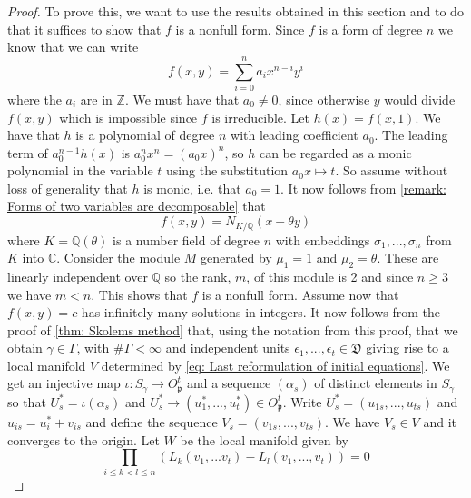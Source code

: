 \documentclass{article}
\newcommand{\mfrak}[1]{\mathfrak{#1}}
\newcommand{\mbb}[1]{\mathbb{#1}}
\numberwithin{equation}{section}
\begin{document}
\begin{proof}
	To prove this, we want to use the results obtained in this section and to do that it suffices to show that $f$ is a  nonfull form. Since $f$ is a form of degree $n$ we know that we can write
	$$f(x,y) = \sum_{i = 0}^n a_i x^{n-i} y^{i}$$
	where the $a_i$ are in $\mbb Z$. We must have that $a_0 \neq 0$, since otherwise $y$ would divide $f(x,y)$ which is impossible since $f$ is irreducible. Let $h(x) = f(x,1)$. We have that $h$ is a polynomial of degree $n$ with leading coefficient $a_0$. The leading term of $a_0^{n-1} h(x)$ is $a_0^nx^n = (a_0 x)^n$, so $h$ can be regarded as a monic polynomial in the variable $t$ using the substitution $a_0 x \mapsto t$. So assume without loss of generality that $h$ is monic, i.e. that $a_0 = 1$. It now follows from \cref{remark: Forms of two variables are decomposable} that
	\begin{equation}\label{eq: f(x,y) is a norm form}
    	f(x, y) = N_{K / \mbb Q}(x + \theta y)
	\end{equation}
	where $K = \mbb Q(\theta)$ is a number field of degree $n$ with embeddings $\sigma_1, ..., \sigma_n$ from $K$ into $\mbb C$. Consider the module $M$ generated by $\mu_1 = 1$ and $\mu_2 = \theta$. These are linearly independent over $\mbb Q$ so the rank, $m$, of this module is 2 and since $n \geq 3$ we have $m < n$. This shows that $f$ is a nonfull form. Assume now that $f(x,y) = c$ has infinitely many solutions in integers. It now follows from the proof of \cref{thm: Skolems method} that, using the notation from this proof,  that we obtain $\gamma \in \Gamma$, with $\# \Gamma < \infty$ and independent units $\epsilon_1, ..., \epsilon_t \in \mfrak D$ giving rise to a local manifold $V$ determined by \cref{eq: Last reformulation of initial equations}. We get an injective map $\iota : S_\gamma \to O_\mfrak p^t$ and a sequence $(\alpha_s)$ of distinct elements in $S_\gamma$ so that $U^*_s = \iota(\alpha_s)$ and $U^*_s \to (u_1^*, ..., u_t^*) \in O_\mfrak p^t$. Write $U^*_s = (u_{1s}, ..., u_{ts})$ and $u_{is} = u_i^* + v_{is}$ and define the sequence $V_s = (v_{1s}, ..., v_{ts})$. We have $V_s \in V$ and it converges to the origin. Let $W$ be the local manifold given by
	$$\prod_{i \leq k < l \leq n} (L_k(v_1, ...v_t) - L_l(v_1, ...,  v_t)) = 0$$

\end{proof}
\end{document}
